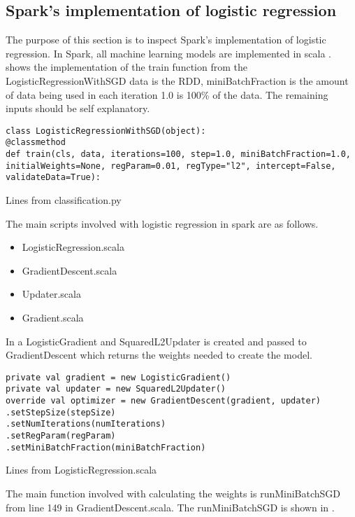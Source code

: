 \subsection{Spark's implementation of logistic regression}\label{sec:sparklogreg}


The purpose of this section is to inspect Spark’s implementation of logistic regression.
In Spark, all machine learning models are implemented in scala \cite{sparkml}. shows the implementation of the train function from the LogisticRegressionWithSGD data is the RDD, miniBatchFraction is the amount of data being used in each iteration 1.0 is 100\% of the data. The remaining inputs should be self explanatory.   
\begin{listing}[H]
\begin{verbatim}
class LogisticRegressionWithSGD(object):
@classmethod
def train(cls, data, iterations=100, step=1.0, miniBatchFraction=1.0,
initialWeights=None, regParam=0.01, regType="l2", intercept=False,
validateData=True):
\end{verbatim}
\caption{Lines from classification.py}
\label{lst:py_logreg}
\end{listing}
The main scripts involved with logistic regression in spark are as follows.
\begin{itemize}
\item LogisticRegression.scala
\item GradientDescent.scala
\item Updater.scala
\item Gradient.scala
\end{itemize}
In  a LogisticGradient and SquaredL2Updater is created and passed to GradientDescent which returns the weights needed to create the model.
\begin{listing}[H]
\begin{verbatim}
private val gradient = new LogisticGradient()
private val updater = new SquaredL2Updater()
override val optimizer = new GradientDescent(gradient, updater)
.setStepSize(stepSize)
.setNumIterations(numIterations)
.setRegParam(regParam)
.setMiniBatchFraction(miniBatchFraction)
\end{verbatim}
\caption{Lines from LogisticRegression.scala}
\label{lst:gd_logreg}
\end{listing}

The main function involved with calculating the weights is runMiniBatchSGD from line 149 in GradientDescent.scala. The runMiniBatchSGD is shown in . 

